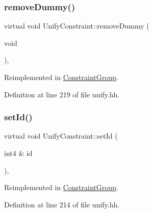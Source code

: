 \mbox{\label{class_unify_constraint_ab2ca6cad0ed83f5c765bd0ee8682ca36}} 
\subsubsection{\texorpdfstring{removeDummy()}{removeDummy()}}
{\footnotesize\ttfamily virtual void Unify\+Constraint\+::remove\+Dummy (\begin{DoxyParamCaption}\item[{void}]{ }\end{DoxyParamCaption})\hspace{0.3cm}{\ttfamily [inline]}, {\ttfamily [virtual]}}



Reimplemented in \mbox{\hyperlink{class_constraint_group_adf801a2e01c28608fcf7c19305cbb08b}{Constraint\+Group}}.



Definition at line 219 of file unify.\+hh.

\mbox{\label{class_unify_constraint_ae839484226265859ee04807fd7bb7775}} 
\subsubsection{\texorpdfstring{setId()}{setId()}}
{\footnotesize\ttfamily virtual void Unify\+Constraint\+::set\+Id (\begin{DoxyParamCaption}\item[{int4 \&}]{id }\end{DoxyParamCaption})\hspace{0.3cm}{\ttfamily [inline]}, {\ttfamily [virtual]}}



Reimplemented in \mbox{\hyperlink{class_constraint_group_a89e8251b6b4ed3c291cf1503531fac20}{Constraint\+Group}}.



Definition at line 214 of file unify.\+hh.

\mbox{\label{class_unify_constraint_ad9ab4ad91037f96bf803735d414d212d}} 
